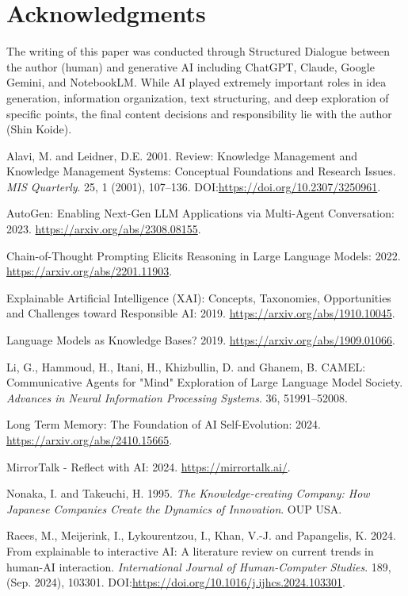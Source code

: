 \documentclass[11pt]{article}
\begin{document}
\section{Acknowledgments}
The writing of this paper was conducted through Structured Dialogue between the author (human) and generative AI including ChatGPT, Claude, Google Gemini, and NotebookLM. While AI played extremely important roles in idea generation, information organization, text structuring, and deep exploration of specific points, the final content decisions and responsibility lie with the author (Shin Koide).
\begin{thebibliography}{99}
 Alavi, M. and Leidner, D.E. 2001. Review: Knowledge Management and Knowledge Management Systems: Conceptual Foundations and Research Issues. \textit{MIS Quarterly}. 25, 1 (2001), 107–136. DOI:\url{https://doi.org/10.2307/3250961}.

 AutoGen: Enabling Next-Gen LLM Applications via Multi-Agent Conversation: 2023. \url{https://arxiv.org/abs/2308.08155}.

 Chain-of-Thought Prompting Elicits Reasoning in Large Language Models: 2022. \url{https://arxiv.org/abs/2201.11903}.

 Explainable Artificial Intelligence (XAI): Concepts, Taxonomies, Opportunities and Challenges toward Responsible AI: 2019. \url{https://arxiv.org/abs/1910.10045}.

 Language Models as Knowledge Bases? 2019. \url{https://arxiv.org/abs/1909.01066}.

 Li, G., Hammoud, H., Itani, H., Khizbullin, D. and Ghanem, B. CAMEL: Communicative Agents for "Mind" Exploration of Large Language Model Society. \textit{Advances in Neural Information Processing Systems}. 36, 51991–52008.

 Long Term Memory: The Foundation of AI Self-Evolution: 2024. \url{https://arxiv.org/abs/2410.15665}.

 MirrorTalk - Reflect with AI: 2024. \url{https://mirrortalk.ai/}.

 Nonaka, I. and Takeuchi, H. 1995. \textit{The Knowledge-creating Company: How Japanese Companies Create the Dynamics of Innovation}. OUP USA.

 Raees, M., Meijerink, I., Lykourentzou, I., Khan, V.-J. and Papangelis, K. 2024. From explainable to interactive AI: A literature review on current trends in human-AI interaction. \textit{International Journal of Human-Computer Studies}. 189, (Sep. 2024), 103301. DOI:\url{https://doi.org/10.1016/j.ijhcs.2024.103301}.


\end{thebibliography}
\end{document}
